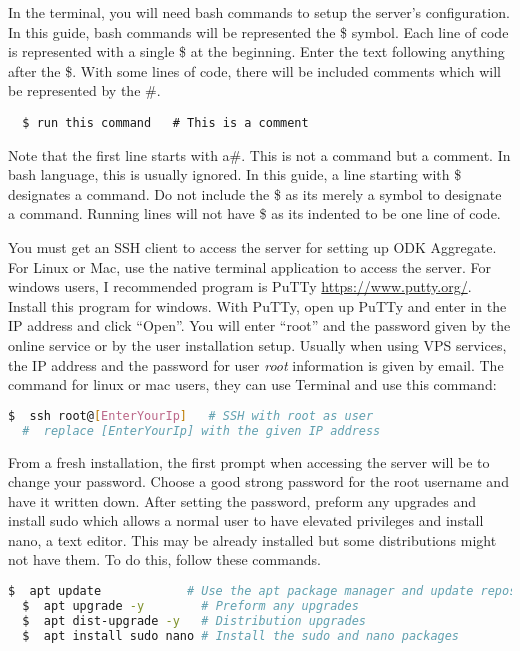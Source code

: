 \noindent
In the terminal, you will need bash commands to setup the server's configuration. In this guide, bash commands will be represented the \$ symbol. Each line of code is represented with a single \$ at the beginning. Enter the text following anything after the \$. With some lines of code, there will be included comments which will be represented by the \#.

\begin{lstlisting}
  $ run this command   # This is a comment
\end{lstlisting}

Note that the first line starts with a\#. This is not a command but a comment. In bash language, this is usually ignored. In this guide, a line starting with \$ designates a command. Do not include the \$ as its merely a symbol to designate a command. Running lines will not have \$ as its indented to be one line of code.


You must get an SSH client to access the server for setting up ODK Aggregate. For Linux or Mac, use the native terminal application to access the server. For windows users, I recommended program is PuTTy \url{https://www.putty.org/}. Install this program for windows. With PuTTy, open up PuTTy and enter in the IP address and click ``Open''. You will enter ``root'' and the password given by the online service or by the user installation setup.  Usually when using VPS services, the IP address and the password for user \emph{root} information is given by email.
\noindent
The command for linux or mac users, they can use Terminal and use this command:
\begin{lstlisting}[language=bash]
  $  ssh root@[EnterYourIp]   # SSH with root as user
  #  replace [EnterYourIp] with the given IP address
\end{lstlisting}

From a fresh installation, the first prompt when accessing the server will be to change your password. Choose a good strong password for the root username and have it written down.  After setting the password, preform any upgrades and install sudo which allows a normal user to have elevated privileges and install nano, a text editor. This may be already installed but some distributions might not have them. To do this, follow these commands.

\begin{lstlisting}[language=bash]
  $  apt update            # Use the apt package manager and update repository
  $  apt upgrade -y        # Preform any upgrades
  $  apt dist-upgrade -y   # Distribution upgrades
  $  apt install sudo nano # Install the sudo and nano packages
\end{lstlisting}

